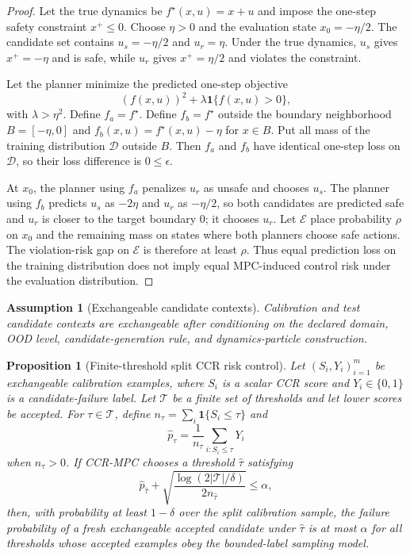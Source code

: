 \documentclass[11pt]{article}
\newtheorem{proposition}{Proposition}
\newtheorem{assumption}{Assumption}
\begin{document}
\begin{proof}
Let the true dynamics be $f^\star(x,u)=x+u$ and impose the one-step safety constraint $x^+\leq 0$. Choose $\eta>0$ and the evaluation state $x_0=-\eta/2$. The candidate set contains $u_s=-\eta/2$ and $u_r=\eta$. Under the true dynamics, $u_s$ gives $x^+=-\eta$ and is safe, while $u_r$ gives $x^+=\eta/2$ and violates the constraint.

Let the planner minimize the predicted one-step objective
\[
  (f(x,u))^2 + \lambda \mathbf{1}\{f(x,u)>0\},
\]
with $\lambda>\eta^2$. Define $f_a=f^\star$. Define $f_b=f^\star$ outside the boundary neighborhood $B=[-\eta,0]$ and $f_b(x,u)=f^\star(x,u)-\eta$ for $x\in B$. Put all mass of the training distribution $\mathcal{D}$ outside $B$. Then $f_a$ and $f_b$ have identical one-step loss on $\mathcal{D}$, so their loss difference is $0\leq\epsilon$.

At $x_0$, the planner using $f_a$ penalizes $u_r$ as unsafe and chooses $u_s$. The planner using $f_b$ predicts $u_s$ as $-2\eta$ and $u_r$ as $-\eta/2$, so both candidates are predicted safe and $u_r$ is closer to the target boundary $0$; it chooses $u_r$. Let $\mathcal{E}$ place probability $\rho$ on $x_0$ and the remaining mass on states where both planners choose safe actions. The violation-risk gap on $\mathcal{E}$ is therefore at least $\rho$. Thus equal prediction loss on the training distribution does not imply equal MPC-induced control risk under the evaluation distribution.
\end{proof}

\begin{assumption}[Exchangeable candidate contexts]
Calibration and test candidate contexts are exchangeable after conditioning on the declared domain, OOD level, candidate-generation rule, and dynamics-particle construction.
\end{assumption}

\begin{proposition}[Finite-threshold split CCR risk control]
Let $(S_i,Y_i)_{i=1}^m$ be exchangeable calibration examples, where $S_i$ is a scalar CCR score and $Y_i\in\{0,1\}$ is a candidate-failure label. Let $\mathcal{T}$ be a finite set of thresholds and let lower scores be accepted. For $\tau\in\mathcal{T}$, define $n_\tau=\sum_i\mathbf{1}\{S_i\leq\tau\}$ and
\[
  \widehat p_\tau = \frac{1}{n_\tau}\sum_{i:S_i\leq\tau} Y_i
\]
when $n_\tau>0$. If CCR-MPC chooses a threshold $\widehat\tau$ satisfying
\[
  \widehat p_{\widehat\tau} +
  \sqrt{\frac{\log(2|\mathcal{T}|/\delta)}{2n_{\widehat\tau}}}
  \leq \alpha,
\]
then, with probability at least $1-\delta$ over the split calibration sample, the failure probability of a fresh exchangeable accepted candidate under $\widehat\tau$ is at most $\alpha$ for all thresholds whose accepted examples obey the bounded-label sampling model.
\end{proposition}
\end{document}
